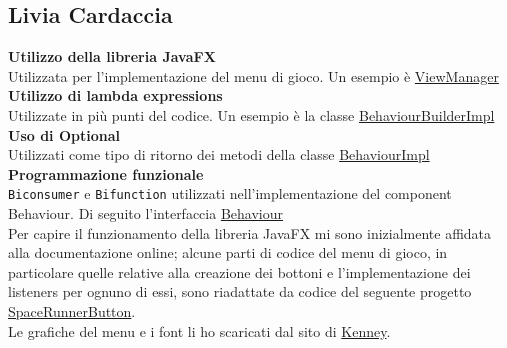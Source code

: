 \documentclass[a4paper,12pt]{report}
\begin{document}
\subsection{Livia Cardaccia}
\textbf{Utilizzo della libreria JavaFX}\\
Utilizzata per l'implementazione del menu di gioco. Un esempio è \href{https://github.com/dennnanni/UNIBOssfight/blob/61e1d141f734d2205d4e8b65fed0ebfc668a8357/UNIBOSSfight/src/main/java/app/ui/ViewManager.java#L31}{ViewManager}\\
\textbf{Utilizzo di lambda expressions}\\
Utilizzate in più punti del codice. Un esempio è la classe \href{https://github.com/dennnanni/UNIBOssfight/blob/61e1d141f734d2205d4e8b65fed0ebfc668a8357/UNIBOSSfight/src/main/java/app/impl/builder/BehaviourBuilderImpl.java#L13}{BehaviourBuilderImpl}\\
\textbf{Uso di Optional}\\
Utilizzati come tipo di ritorno dei metodi della classe
\href{https://github.com/dennnanni/UNIBOssfight/blob/61e1d141f734d2205d4e8b65fed0ebfc668a8357/UNIBOSSfight/src/main/java/app/impl/component/BehaviourImpl.java#L29}{BehaviourImpl}\\
\textbf{Programmazione funzionale}\\
\texttt{Biconsumer} e \texttt{Bifunction} utilizzati nell'implementazione del component Behaviour. Di seguito l'interfaccia \href{https://github.com/dennnanni/UNIBOssfight/blob/61e1d141f734d2205d4e8b65fed0ebfc668a8357/UNIBOSSfight/src/main/java/app/core/component/Behaviour.java#L14}{Behaviour}\\
\newline
Per capire il funzionamento della libreria JavaFX mi sono inizialmente affidata alla documentazione online; alcune parti di codice del menu di gioco, in particolare quelle relative alla creazione dei bottoni e l'implementazione dei listeners per ognuno di essi, sono riadattate da codice del seguente progetto \href{https://github.com/smowgli/space-runner-game-javafx/blob/dcbb51c278680951043d41d520e1a093f55701dc/src/model/SpaceRunnerButton.java#L11}{SpaceRunnerButton}.\\
Le grafiche del menu e i font li ho scaricati dal sito di \href{https://kenney.nl/}{Kenney}.\\
\end{document}
